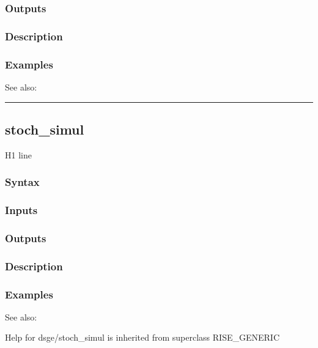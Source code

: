 \documentclass[letterpaper,10pt,english]{sphinxmanual}
\begin{document}
\subsubsection{Outputs}
\label{classes/models/@dsge/dsge:id190}

\subsubsection{Description}
\label{classes/models/@dsge/dsge:id191}

\subsubsection{Examples}
\label{classes/models/@dsge/dsge:id192}
See also:


\bigskip\hrule{}\bigskip



\subsection{stoch\_simul}
\label{classes/models/@dsge/dsge:id193}\label{classes/models/@dsge/dsge:stoch-simul}
H1 line


\subsubsection{Syntax}
\label{classes/models/@dsge/dsge:id194}

\subsubsection{Inputs}
\label{classes/models/@dsge/dsge:id195}

\subsubsection{Outputs}
\label{classes/models/@dsge/dsge:id196}

\subsubsection{Description}
\label{classes/models/@dsge/dsge:id197}

\subsubsection{Examples}
\label{classes/models/@dsge/dsge:id198}
See also:

Help for dsge/stoch\_simul is inherited from superclass RISE\_GENERIC
\end{document}
